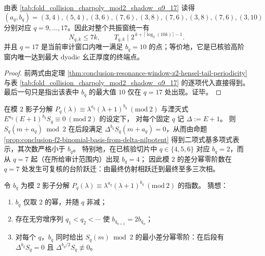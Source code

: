 \begin{corollary}\label{cor:conclusion-resonance-window-unified-dyadic-shell-extremal-endpoint}
由表 \ref{tab:fold_collision_charpoly_mod2_shadow_q9_17} 读得
\[
(a_q,b_q)=
(3,4),(5,4),(3,6),(7,6),(3,8),(7,6),(3,8),(7,6),(3,10)
\]
分别对应 \(q=9,\dots,17\)。因此对整个共振窗统一有
\[
N_{q,k}\le 7k,
\qquad
T_{q,k}\mid 2^{\,k+\lceil\log_2(10k)\rceil-1}.
\]
并且 \(q=17\) 是当前审计窗口内唯一满足 \(b_q=10\) 的点；等价地，它是已核验高阶窗内唯一达到最大 dyadic 幺正厚度的终端点。
\end{corollary}
\begin{proof}
前两式由定理 \ref{thm:conclusion-resonance-window-z2-hensel-tail-periodicity} 与表 \ref{tab:fold_collision_charpoly_mod2_shadow_q9_17} 的逐项代入直接得到。最后一句只是指出该表中 \(b_q\) 的最大值 \(10\) 仅在 \(q=17\) 处出现。证毕。
\end{proof}

\begin{corollary}[模 \(2\) 影子差分阶数的台阶跃迁与碰撞矩奇偶动力学的可检验分级]\label{cor:conclusion-fold-collision-mod2-step-jump-q7}
在模 \(2\) 影子分解
\(
P_q(\lambda)\equiv \lambda^{a_q}(\lambda+1)^{b_q}\ (\mathrm{mod}\ 2)
\)
与湮灭式 \(E^{a_q}(E+1)^{b_q}S_q\equiv 0\ (\mathrm{mod}\ 2)\) 的设定下，
对每个固定 \(q\) 记 \(\Delta:=E+1\)。
则 \(S_q(m+a_q)\bmod 2\) 在后段满足 \(\Delta^{b_q}S_q(m+a_q)=0\)，从而由命题 \ref{prop:conclusion-f2-binomial-basis-from-delta-nilpotent} 得到二项式基多项式表示，其次数严格小于 \(b_q\)。
特别地，在已核验切片中 \(q\in\{4,5,6\}\) 对应 \(b_q=2\)，而从 \(q=7\) 起（在所给审计范围内）出现 \(b_q=4\)；
因此模 \(2\) 的差分幂零阶数在 \(q=7\) 处发生可复核的台阶跃迁：由最终仿射相跃迁到最终至多三次相。
\end{corollary}

\begin{conjecture}\label{conj:conclusion-fold-collision-mod2-power-tower}
令 \(b_q\) 为模 \(2\) 影子分解 \(P_q(\lambda)\equiv \lambda^{a_q}(\lambda+1)^{b_q}\ (\mathrm{mod}\ 2)\) 的指数。
猜想：
\begin{enumerate}
  \item \(b_q\) 仅取 \(2\) 的幂，并随 \(q\) 非减；
  \item 存在无穷增序列 \(q_1<q_2<\cdots\) 使 \(b_{q_{n+1}}=2b_{q_n}\)；
  \item 对每个 \(q\)，\(b_q\) 同时给出 \(S_q(m)\bmod 2\) 的最小差分幂零阶：在后段有 \(\Delta^{b_q}S_q=0\) 且 \(\Delta^{b_q/2}S_q\not\equiv 0\)。
\end{enumerate}
\end{conjecture}

